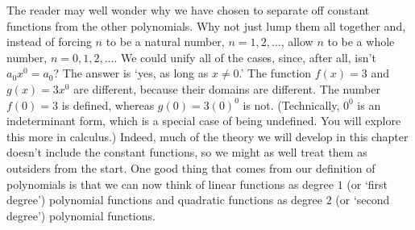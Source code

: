 \documentclass{ximera}
\begin{document}
The reader may well wonder why we have chosen to separate off constant functions from the other polynomials.  Why not just lump them all together and, instead of forcing $n$ to be a natural number, $n = 1, 2, \ldots$, allow $n$ to be a whole number, $n = 0, 1, 2, \ldots$.  We could unify all of the cases, since, after all, isn't $a_{0}x^{0} = a_{0}$?  The answer is `yes, as long as $x\neq 0$.'  The function $f(x) = 3$ and $g(x) = 3x^{0}$ are different, because their domains are different.  The number $f(0) = 3$ is defined, whereas $g(0) = 3(0)^{0}$ is not.  (Technically, $0^{0}$ is an indeterminant form, which is a special case of being undefined.  You will explore this more in calculus.)  Indeed, much of the theory we will develop in this chapter doesn't include the constant functions, so we might as well treat them as outsiders from the start.  One good thing that comes from our definition of polynomials is that we can now think of linear functions as degree $1$ (or `first degree') polynomial functions and quadratic functions as degree $2$ (or `second degree') polynomial functions.
\end{document}
